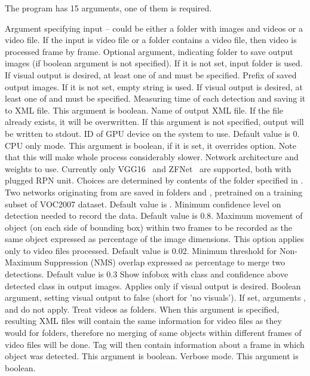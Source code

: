 The program  has 15 arguments, one of them is required.
\begin{description}
 Argument specifying input -- could be either a folder with images and videos or a video file. If the input is video file or a folder contains a video file, then video is processed frame by frame.
 Optional argument, indicating folder to save output images (if boolean argument  is not specified). If it is not set, input folder is used. If visual output is desired, at least one of  and  must be specified.
 Prefix of saved output images. If it is not set, empty string is used. If visual output is desired, at least one of  and  must be specified.
 Measuring time of each detection and saving it to XML file. This argument is boolean.
 Name of output XML file. If the file already exists, it will be overwritten. If this argument is not specified, output will be written to stdout.
 ID of GPU device on the system to use. Default value is 0.
 CPU only mode. This argument is boolean, if it is set, it overrides  option. Note that this will make whole process considerably slower.
 Network architecture and weights to use. Currently only VGG16~\cite{vgg16} and ZFNet~\cite{zfnet} are supported, both with plugged RPN unit. Choices are determined by contents of the folder  specified in \hyperref[init]{}. Two networks originating from \cite{faster} are saved in folders  and , pretrained on a training subset of VOC2007\cite{voc2007} dataset. Default value is .
 Minimum confidence level on detection needed to record the data. Default value is 0.8.
 Maximum movement of object (on each side of bounding box) within two frames to be recorded as the same object expressed as percentage of the image dimensions. This option applies only to video files processed. Default value is 0.02.
 Minimum threshold for Non-Maximum Suppression (NMS) overlap expressed as percentage to merge two detections. Default value is 0.3
 Show infobox with class and confidence above detected class in output images. Applies only if visual output is desired.
 Boolean argument, setting visual output to false (short for 'no visuals'). If set, arguments ,  and  do not apply.
 Treat videos as folders. When this argument is specified, resulting XML files will contain the same information for video files as they would for folders, therefore no merging of same objects within different frames of video files will be done. Tag  will then contain information about a frame in which object was detected. This argument is boolean.
 Verbose mode. This argument is boolean.
\end{description}

